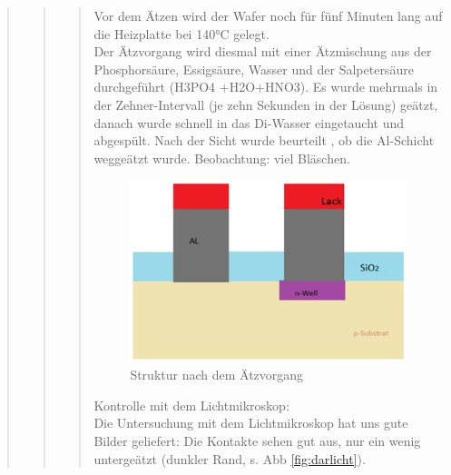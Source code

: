 \begin{quote}
\begin{quote}
\begin{quote}
			Vor dem Ätzen wird der Wafer noch für fünf Minuten lang auf die 
			Heizplatte bei 140°C gelegt.\\
			Der Ätzvorgang wird diesmal mit einer Ätzmischung aus der 
			Phosphorsäure, Essigsäure, Wasser und der Salpetersäure durchgeführt
			(H3PO4 +H2O+HNO3). Es wurde mehrmals in der Zehner-Intervall 
			(je zehn Sekunden in der Lösung) geätzt, danach wurde schnell in das 
			Di-Wasser eingetaucht und abgespült.  Nach der Sicht wurde beurteilt
			, ob die Al-Schicht weggeätzt wurde. Beobachtung: viel 
			Bläschen.
			
			\vspace{2em}

    		\begin{figure}[H]
				\hspace{3 cm}
                  \includegraphics[scale=1, trim = 0cm 0cm 0cm 0cm,clip]
                	{./HerstellungBilder/StrukturnachdemAetzvorgang.png}
                  \caption{Struktur nach dem Ätzvorgang}
                \label{fig:Strukaetz}
            \end{figure}
            
    		\vspace{2em}
    		
    		Kontrolle mit dem Lichtmikroskop: \\

			Die Untersuchung mit dem Lichtmikroskop hat uns gute Bilder 
			geliefert: Die Kontakte sehen gut aus, nur ein wenig untergeätzt 
			(dunkler Rand, s. Abb \ref{fig:darlicht}).
			
			\vspace{2em}


\end{quote}
\end{quote}
\end{quote}
